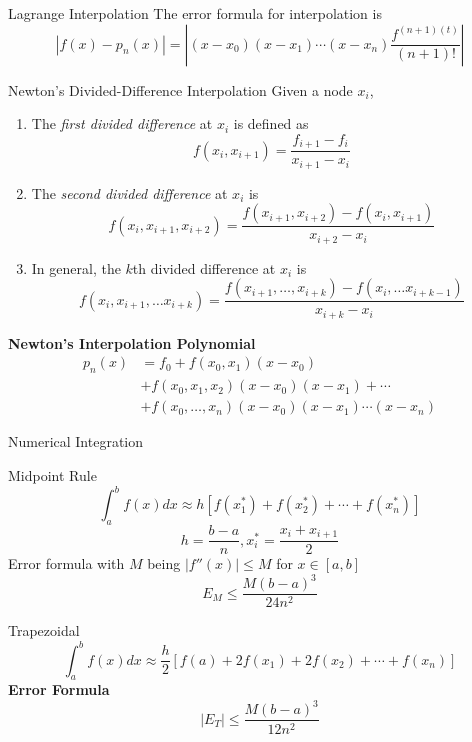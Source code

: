 \documentclass{article}
\begin{document}
\begin{multicols*}{3}
\begin{blackbox}{Lagrange Interpolation}
{        The error formula for interpolation is \\[-4ex]
        \[|f(x) - p_n(x)| = \left|(x-x_0)(x-x_1)\cdots(x-x_n)\frac{f^{(n+1)(t)}}{(n+1)!}\right| \]
        }
    \end{blackbox}
    \begin{blackbox}{Newton's Divided-Difference Interpolation}
        Given a node $x_i$, 
        \begin{enumerate}[leftmargin=8pt]
            \item The \emph{first divided difference} at $x_i$ is defined as 
            \[f(x_i,x_{i+1}) = \frac{f_{i+1}- f_i}{x_{i+1} - x_i}\]
            \item The \emph{second divided difference} at $x_i$ is 
            \[f(x_i, x_{i+1}, x_{i+2}) = \frac{f(x_{i+1}, x_{i+2}) - f(x_i,x_{i+1})}{x_{i+2}-x_i}\]
            \item In general, the $k$th divided difference at $x_i$ is 
            {\footnotesize
            \[f(x_i, x_{i+1}, \ldots x_{i+k}) = \frac{f(x_{i+1},\ldots, x_{i+k}) - f(x_i, \ldots x_{i+k-1})}{x_{i+k}-x_i}\]
            }
        \end{enumerate}
        \textbf{Newton's Interpolation Polynomial} 
        \begin{align*}
            p_n(x) &= f_0 + f(x_0,x_1)(x-x_0)\\
            &+ f(x_0,x_1,x_2)(x-x_0)(x-x_1) + \cdots\\
            &+ f(x_0,\ldots,x_n)(x-x_0)(x-x_1)\cdots(x - x_n)
        \end{align*}
    \end{blackbox}
    \begin{blackbox}{Numerical Integration}
        {\footnotesize
            \begin{bluebox}{Midpoint Rule}
                \[\int_a^b f(x)dx \approx h[f(x_1^*) + f(x_2^*) + \cdots + f(x_n^*)]\]
                \[h = \frac{b-a}{n}, x_i^* = \frac{x_i + x_{i+1}}{2}\]
                Error formula with $M$ being $|f''(x)| \leq M$ for $x \in [a,b]$
                \[E_M \leq \frac{M(b-a)^3}{24n^2}\]
            \end{bluebox}
            \begin{brownbox}{Trapezoidal}
                \[\int_a^b f(x)dx\approx \frac{h}{2}\left[f(a) + 2f(x_1) + 2f(x_2) + \cdots + f(x_n)\right]\]
                \textbf{Error Formula}\\[-2ex]
                \[|E_T| \leq \frac{M(b-a)^3}{12n^2}\]
            \end{brownbox}
}
\end{blackbox}
\end{multicols*}
\end{document}

